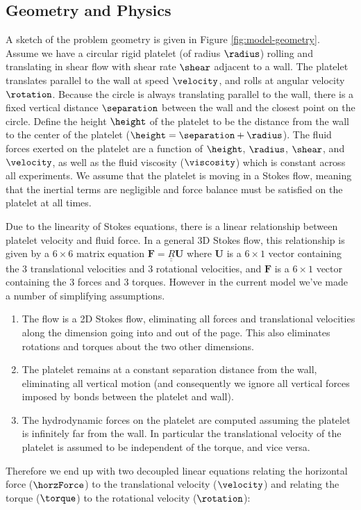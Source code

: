 \subsection{Geometry and Physics}
\label{sec:geometry-physics}

A sketch of the problem geometry is given in Figure
\ref{fig:model-geometry}. Assume we have a circular rigid platelet (of
radius $\radius$) rolling and translating in shear flow with shear
rate $\shear$ adjacent to a wall. The platelet translates parallel to
the wall at speed $\velocity$, and rolls at angular velocity
$\rotation$. Because the circle is always translating parallel to the
wall, there is a fixed vertical distance $\separation$ between the
wall and the closest point on the circle. Define the height $\height$
of the platelet to be the distance from the wall to the center of the
platelet ($\height = \separation + \radius$). The fluid forces exerted
on the platelet are a function of $\height$, $\radius$, $\shear$, and
$\velocity$, as well as the fluid viscosity ($\viscosity$) which is
constant across all experiments. We assume that the platelet is moving
in a Stokes flow, meaning that the inertial terms are negligible and
force balance must be satisfied on the platelet at all times.

Due to the linearity of Stokes equations, there is a linear
relationship between platelet velocity and fluid force. In a general
3D Stokes flow, this relationship is given by a $6 \times 6$ matrix
equation $\mathbf{F} = \underline{\underline{R}} \mathbf{U}$ where
$\mathbf{U}$ is a $6 \times 1$ vector containing the 3 translational
velocities and 3 rotational velocities, and $\mathbf{F}$ is a
$6 \times 1$ vector containing the 3 forces and 3 torques. However in
the current model we've made a number of simplifying assumptions.
\begin{enumerate}
\item The flow is a 2D Stokes flow, eliminating all forces and
  translational velocities along the dimension going into and out of
  the page. This also eliminates rotations and torques about the two
  other dimensions.
\item The platelet remains at a constant separation distance from the
  wall, eliminating all vertical motion (and consequently we ignore
  all vertical forces imposed by bonds between the platelet and wall).
\item The hydrodynamic forces on the platelet are computed assuming
  the platelet is infinitely far from the wall. In particular the
  translational velocity of the platelet is assumed to be independent
  of the torque, and vice versa.
\end{enumerate}
Therefore we end up with two decoupled linear equations relating the
horizontal force ($\horzForce$) to the translational velocity
($\velocity$) and relating the torque ($\torque$) to the rotational
velocity ($\rotation$):

